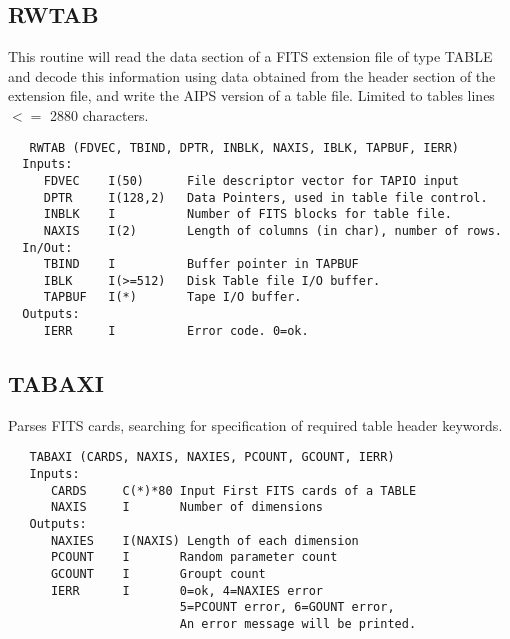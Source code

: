 \subsection{RWTAB}
This routine will read the data section of a FITS extension file
of type TABLE and decode this information using data obtained from
the header section of the extension file, and write the AIPS version
of a table file.  Limited to tables lines $<=$ 2880 characters.
\begin{verbatim}
   RWTAB (FDVEC, TBIND, DPTR, INBLK, NAXIS, IBLK, TAPBUF, IERR)
  Inputs:
     FDVEC    I(50)      File descriptor vector for TAPIO input
     DPTR     I(128,2)   Data Pointers, used in table file control.
     INBLK    I          Number of FITS blocks for table file.
     NAXIS    I(2)       Length of columns (in char), number of rows.
  In/Out:
     TBIND    I          Buffer pointer in TAPBUF
     IBLK     I(>=512)   Disk Table file I/O buffer.
     TAPBUF   I(*)       Tape I/O buffer.
  Outputs:
     IERR     I          Error code. 0=ok.
\end{verbatim}

\subsection{TABAXI}
Parses FITS cards, searching for specification of required
table header keywords.
\begin{verbatim}
   TABAXI (CARDS, NAXIS, NAXIES, PCOUNT, GCOUNT, IERR)
   Inputs:
      CARDS     C(*)*80 Input First FITS cards of a TABLE
      NAXIS     I       Number of dimensions
   Outputs:
      NAXIES    I(NAXIS) Length of each dimension
      PCOUNT    I       Random parameter count
      GCOUNT    I       Groupt count
      IERR      I       0=ok, 4=NAXIES error
                        5=PCOUNT error, 6=GOUNT error,
                        An error message will be printed.
\end{verbatim}

